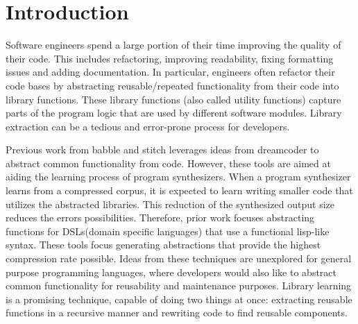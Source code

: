 \section{Introduction}

Software engineers spend a large portion of their time improving the quality of their code. This includes refactoring, improving readability, fixing formatting issues and adding documentation. In particular, engineers often refactor their code bases by abstracting reusable/repeated functionality from their code into library functions. These library functions (also called utility functions) capture parts of the program logic that are used by different software modules. 
Library extraction can be a tedious and error-prone process for developers. 


Previous work from babble and stitch \cite{Cao_2023babble, Bowers_2023stitch} leverages ideas from dreamcoder \cite{ellis2020dreamcoder} to abstract common functionality from code. However, these tools are aimed at aiding the learning process of program synthesizers. When a program synthesizer learns from a compressed corpus, it is expected to learn writing smaller code that utilizes the abstracted libraries. This reduction of the synthesized output size reduces the errors possibilities. Therefore, prior work focuses abstracting functions for DSLs(domain specific languages) that use a functional lisp-like syntax.  These tools focus generating abstractions that provide the highest compression rate possible.
Ideas from these techniques are unexplored for general purpose programming languages, where developers would also like to abstract common functionality for reusability and maintenance purposes. 
Library learning is a promising technique, capable of doing two things at once: extracting reusable functions in a recursive manner and rewriting code to find reusable components. 

